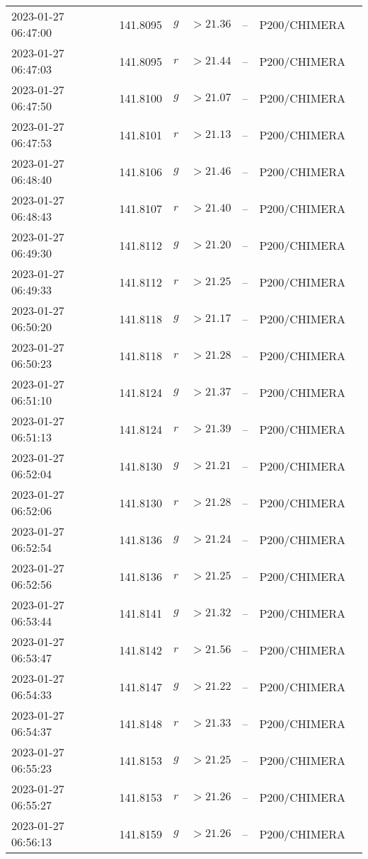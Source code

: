 \documentclass{nature_plusfigure}
\begin{document}
\begin{supplement}
\begin{center}
\begin{longtable}{lllllll}
2023-01-27 06:47:00 & 141.8095 & $g$ & $>21.36$ & -- & P200/CHIMERA &  \\ 
2023-01-27 06:47:03 & 141.8095 & $r$ & $>21.44$ & -- & P200/CHIMERA &  \\ 
2023-01-27 06:47:50 & 141.8100 & $g$ & $>21.07$ & -- & P200/CHIMERA &  \\ 
2023-01-27 06:47:53 & 141.8101 & $r$ & $>21.13$ & -- & P200/CHIMERA &  \\ 
2023-01-27 06:48:40 & 141.8106 & $g$ & $>21.46$ & -- & P200/CHIMERA &  \\ 
2023-01-27 06:48:43 & 141.8107 & $r$ & $>21.40$ & -- & P200/CHIMERA &  \\ 
2023-01-27 06:49:30 & 141.8112 & $g$ & $>21.20$ & -- & P200/CHIMERA &  \\ 
2023-01-27 06:49:33 & 141.8112 & $r$ & $>21.25$ & -- & P200/CHIMERA &  \\ 
2023-01-27 06:50:20 & 141.8118 & $g$ & $>21.17$ & -- & P200/CHIMERA &  \\ 
2023-01-27 06:50:23 & 141.8118 & $r$ & $>21.28$ & -- & P200/CHIMERA &  \\ 
2023-01-27 06:51:10 & 141.8124 & $g$ & $>21.37$ & -- & P200/CHIMERA &  \\ 
2023-01-27 06:51:13 & 141.8124 & $r$ & $>21.39$ & -- & P200/CHIMERA &  \\ 
2023-01-27 06:52:04 & 141.8130 & $g$ & $>21.21$ & -- & P200/CHIMERA &  \\ 
2023-01-27 06:52:06 & 141.8130 & $r$ & $>21.28$ & -- & P200/CHIMERA &  \\ 
2023-01-27 06:52:54 & 141.8136 & $g$ & $>21.24$ & -- & P200/CHIMERA &  \\ 
2023-01-27 06:52:56 & 141.8136 & $r$ & $>21.25$ & -- & P200/CHIMERA &  \\ 
2023-01-27 06:53:44 & 141.8141 & $g$ & $>21.32$ & -- & P200/CHIMERA &  \\ 
2023-01-27 06:53:47 & 141.8142 & $r$ & $>21.56$ & -- & P200/CHIMERA &  \\ 
2023-01-27 06:54:33 & 141.8147 & $g$ & $>21.22$ & -- & P200/CHIMERA &  \\ 
2023-01-27 06:54:37 & 141.8148 & $r$ & $>21.33$ & -- & P200/CHIMERA &  \\ 
2023-01-27 06:55:23 & 141.8153 & $g$ & $>21.25$ & -- & P200/CHIMERA &  \\ 
2023-01-27 06:55:27 & 141.8153 & $r$ & $>21.26$ & -- & P200/CHIMERA &  \\ 
2023-01-27 06:56:13 & 141.8159 & $g$ & $>21.26$ & -- & P200/CHIMERA &  \\ 

\end{longtable}
\end{center}
\end{supplement}
\end{document}

